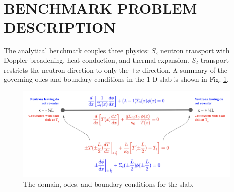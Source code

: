 \documentclass[letterpaper]{mc2023}
\begin{document}
\section{BENCHMARK PROBLEM DESCRIPTION}
\label{sec:benchmark}
The analytical benchmark couples three physics: $S_2$ neutron transport with Doppler broadening, heat conduction,
and thermal expansion. $S_{2}$ transport restricts the neutron direction to only the $\pm x$ direction. A summary of the governing
\glspl{ode} and boundary conditions in the 1-D slab is shown in Fig. \ref{fig:slab_diagram}.
\begin{figure}[H]
    \centering
    \includegraphics[width=0.85\linewidth]{figures/1D_Benchmark_Diagram.png}
    \caption{The domain, \glspl{ode}, and boundary conditions for the slab.}
    \label{fig:slab_diagram}
\end{figure}
\end{document}

